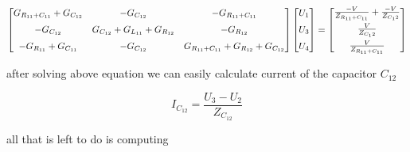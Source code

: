 \documentclass[notitlepage, a4paper, 11pt]{article}
\begin{document}
	$$
		\centering
		\begin{bmatrix}
			G_{R_{11}+C_{11}} + G_{C_{12}} & -G_{C_{12}} & -G_{R_{11}+C_{11}}\\[6pt]
			-G_{C_{12}} & G_{C_{12}} + G_{L_{11}} + G_{R_{12}} & -G_{R_{12}}\\[6pt]
			-G_{R_{11}}+G_{C_{11}} & -G_{C_{12}} & G_{R_{11}+C_{11}} + G_{R_{12}} + G_{C_{12}}
		\end{bmatrix}
		\begin{bmatrix}
			U_1\\[6pt]
			U_3\\[6pt]
			U_4
		\end{bmatrix}
		=
		\begin{bmatrix}
			\frac{-V}{Z_{R_{11}+C_{11}}}+\frac{-V}{Z_{C_12}}\\[6pt]
			\frac{V}{Z_{C_12}}\\[6pt]
			\frac{V}{Z_{R_{11}+C_{11}}}
		\end{bmatrix}
	$$
	
	after solving above equation we can easily calculate current of the capacitor $C_{12}$
	
	$$I_{C_{12}} = \frac{U_3 - U_2}{Z_{C_{12}}}$$

	all that is left to do is computing	
\end{document}
